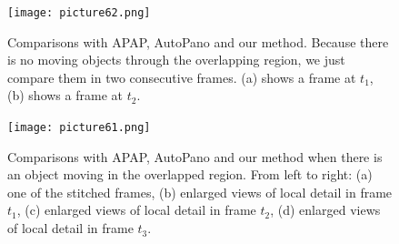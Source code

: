 \documentclass[conference]{IEEEtran}
\begin{document}
\begin{figure}[t]
\centering
\texttt{[image: picture62.png]}
\caption{Comparisons with APAP, AutoPano and our method. Because there is no moving objects through the overlapping region, we just compare them in two consecutive frames. 
(a) shows a frame at $t_1$, (b) shows a frame at $t_2$.}
\label{fig:more4}
\end{figure}

\begin{figure}[t]
\centering
\texttt{[image: picture61.png]}
\caption{Comparisons with APAP, AutoPano and our method when there is an object moving in the overlapped region. From left to right: (a) one of the stitched frames, (b) enlarged views of local
detail in frame $t_1$, (c) enlarged views of local detail in frame $t_2$, (d) enlarged views of local detail in frame $t_3$.}
\label{fig:more3}
\end{figure}




\end{document}
